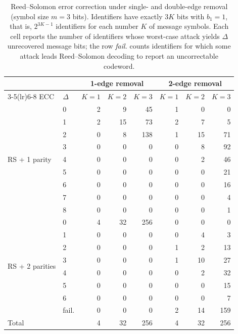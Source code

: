 \begin{table}[htbp]
\centering
\caption{Reed--Solomon error correction under single- and double-edge removal (symbol size $m = 3$ bits). Identifiers have exactly $3K$ bits with $b_1 = 1$, that is, $2^{3K-1}$ identifiers for each number $K$ of message symbols. Each cell reports the number of identifiers whose worst-case attack yields $\Delta$ unrecovered message bits; the row \emph{fail.} counts identifiers for which some attack leads Reed--Solomon decoding to report an uncorrectable codeword.}\label{tab:rs}
\begin{tabular}{llrrrrrr}
\toprule
 & & \multicolumn{3}{c}{1-edge removal} & \multicolumn{3}{c}{2-edge removal} \\
\cmidrule(lr){3-5}\cmidrule(lr){6-8}
ECC & $\Delta$ & $K=1$ & $K=2$ & $K=3$ & $K=1$ & $K=2$ & $K=3$ \\
\midrule
\multirow{9}{*}{RS + 1 parity} & 0 & 2 & 9 & 45 & 1 & 0 & 0 \\
 & 1 & 2 & 15 & 73 & 2 & 7 & 5 \\
 & 2 & 0 & 8 & 138 & 1 & 15 & 71 \\
 & 3 & 0 & 0 & 0 & 0 & 8 & 92 \\
 & 4 & 0 & 0 & 0 & 0 & 2 & 46 \\
 & 5 & 0 & 0 & 0 & 0 & 0 & 21 \\
 & 6 & 0 & 0 & 0 & 0 & 0 & 16 \\
 & 7 & 0 & 0 & 0 & 0 & 0 & 4 \\
 & 8 & 0 & 0 & 0 & 0 & 0 & 1 \\
\midrule
\multirow{8}{*}{RS + 2 parities} & 0 & 4 & 32 & 256 & 0 & 0 & 0 \\
 & 1 & 0 & 0 & 0 & 0 & 4 & 3 \\
 & 2 & 0 & 0 & 0 & 1 & 2 & 13 \\
 & 3 & 0 & 0 & 0 & 1 & 10 & 27 \\
 & 4 & 0 & 0 & 0 & 0 & 2 & 32 \\
 & 5 & 0 & 0 & 0 & 0 & 0 & 15 \\
 & 6 & 0 & 0 & 0 & 0 & 0 & 7 \\
 & fail. & 0 & 0 & 0 & 2 & 14 & 159 \\
\midrule
Total & & 4 & 32 & 256 & 4 & 32 & 256 \\
\bottomrule
\end{tabular}
\end{table}
